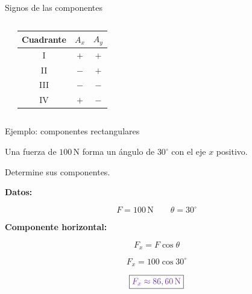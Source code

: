 \documentclass[aspectratio=169,11pt]{beamer}
\newcommand{\resp}[1]{
 \[
 \boxed{\color{morado}{#1}}
 \]
}
\begin{document}
\begin{frame}{Signos de las componentes}

\begin{columns}


\begin{center}
\end{center}


\begin{center}
\renewcommand{\arraystretch}{1.5}
\begin{tabular}{|c|c|c|}
\hline
Cuadrante & \(A_x\) & \(A_y\)\\
\hline
I & \(+\) & \(+\)\\
II & \(-\) & \(+\)\\
III & \(-\) & \(-\)\\
IV & \(+\) & \(-\)\\
\hline
\end{tabular}
\end{center}

\end{columns}

\end{frame}

\begin{frame}{Ejemplo: componentes rectangulares}

Una fuerza de \(100\,\mathrm{N}\)
forma un ángulo de \(30^\circ\)
con el eje \(x\) positivo.

Determine sus componentes.

\textbf{Datos:}

\[
F=100\,\mathrm{N}
\qquad
\theta=30^\circ
\]

\textbf{Componente horizontal:}

\[
F_x=F\cos\theta
\]

\[
F_x=100\cos30^\circ
\]

\resp{F_x\approx86,60\,\mathrm{N}}

\end{frame}
\end{document}
